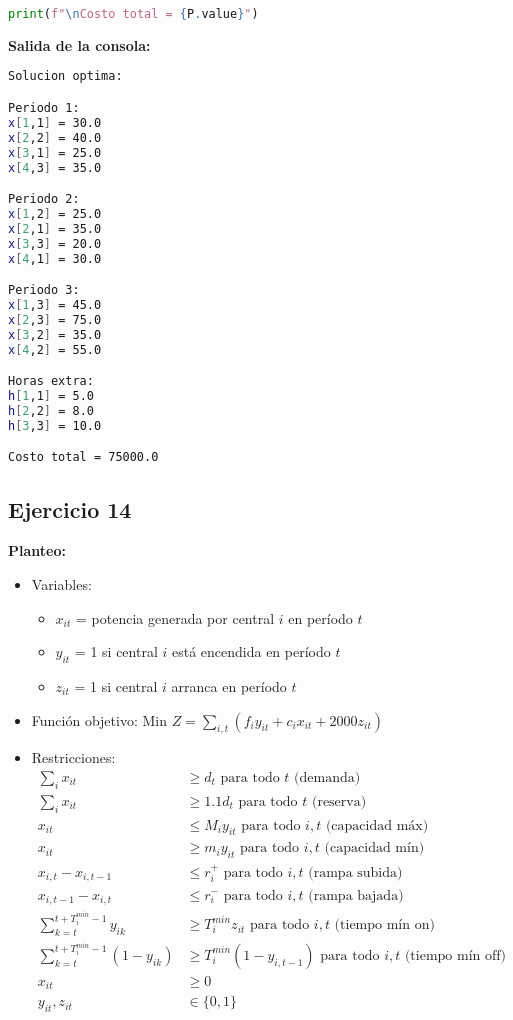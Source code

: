 \documentclass[12pt]{article}
\begin{document}
\begin{enumerate}
\begin{lstlisting}[language=Python]
print(f"\nCosto total = {P.value}")
\end{lstlisting}

\textbf{Salida de la consola:}
\begin{lstlisting}[language=bash,backgroundcolor=\color{black},basicstyle=\color{white}\ttfamily,numbers=none]
Solucion optima:

Periodo 1:
x[1,1] = 30.0
x[2,2] = 40.0
x[3,1] = 25.0
x[4,3] = 35.0

Periodo 2:
x[1,2] = 25.0
x[2,1] = 35.0
x[3,3] = 20.0
x[4,1] = 30.0

Periodo 3:
x[1,3] = 45.0
x[2,3] = 75.0
x[3,2] = 35.0
x[4,2] = 55.0

Horas extra:
h[1,1] = 5.0
h[2,2] = 8.0
h[3,3] = 10.0

Costo total = 75000.0
\end{lstlisting}

\newpage

\subsection*{Ejercicio 14}

\textbf{Planteo:}
\begin{itemize}
\item Variables:
  \begin{itemize}
  \item $x_{it}$ = potencia generada por central $i$ en período $t$
  \item $y_{it}$ = 1 si central $i$ está encendida en período $t$
  \item $z_{it}$ = 1 si central $i$ arranca en período $t$
  \end{itemize}
\item Función objetivo: Min $Z = \sum_{i,t} (f_iy_{it} + c_ix_{it} + 2000z_{it})$
\item Restricciones:
  \begin{align*}
  \sum_i x_{it} &\geq d_t \text{ para todo } t \text{ (demanda)} \\
  \sum_i x_{it} &\geq 1.1d_t \text{ para todo } t \text{ (reserva)} \\
  x_{it} &\leq M_{i}y_{it} \text{ para todo } i,t \text{ (capacidad máx)} \\
  x_{it} &\geq m_{i}y_{it} \text{ para todo } i,t \text{ (capacidad mín)} \\
  x_{i,t} - x_{i,t-1} &\leq r^+_i \text{ para todo } i,t \text{ (rampa subida)} \\
  x_{i,t-1} - x_{i,t} &\leq r^-_i \text{ para todo } i,t \text{ (rampa bajada)} \\
  \sum_{k=t}^{t+T^{min}_i-1} y_{ik} &\geq T^{min}_i z_{it} \text{ para todo } i,t \text{ (tiempo mín on)} \\
  \sum_{k=t}^{t+T^{min}_i-1} (1-y_{ik}) &\geq T^{min}_i (1-y_{i,t-1}) \text{ para todo } i,t \text{ (tiempo mín off)} \\
  x_{it} &\geq 0 \\
  y_{it}, z_{it} &\in \{0,1\}
  \end{align*}
\end{itemize}


\end{enumerate}
\end{document}
